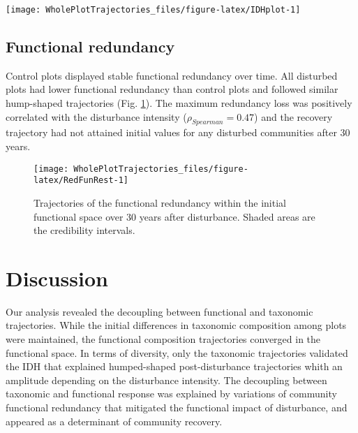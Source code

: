 \documentclass[fleqn,10pt]{ArtEcoFoG} %
\theoremstyle{definition}
\theoremstyle{definition}
\theoremstyle{definition}
\theoremstyle{remark}
\begin{document}
\begin{figure*}

{\centering \texttt{[image: WholePlotTrajectories\_files/figure-latex/IDHplot-1]} 

}

\caption{Relationship between the initial \%AGB loss and community taxonomic richness \textbf{(a)}, taxonomic evenness \textbf{(b)}, functional richness \textbf{(c)}, and functional evenness \textbf{(d)} at 10, 20, and 30 years after disturbance.}\label{fig:IDHplot}
\end{figure*}

\subsection{Functional redundancy}\label{functional-redundancy}

Control plots displayed stable functional redundancy over time. All
disturbed plots had lower functional redundancy than control plots and
followed similar hump-shaped trajectories (Fig. \ref{fig:RedFunRest}).
The maximum redundancy loss was positively correlated with the
disturbance intensity (\(\rho_{Spearman}=0.47\)) and the recovery
trajectory had not attained initial values for any disturbed communities
after 30 years.

\begin{figure}

{\centering \texttt{[image: WholePlotTrajectories\_files/figure-latex/RedFunRest-1]} 

}

\caption{Trajectories of the functional redundancy within the initial functional space over 30 years after disturbance. Shaded areas are the credibility intervals.}\label{fig:RedFunRest}
\end{figure}

\section{Discussion}\label{discussion}

Our analysis revealed the decoupling between functional and taxonomic
trajectories. While the initial differences in taxonomic composition
among plots were maintained, the functional composition trajectories
converged in the functional space. In terms of diversity, only the
taxonomic trajectories validated the IDH that explained humped-shaped
post-disturbance trajectories whith an amplitude depending on the
disturbance intensity. The decoupling between taxonomic and functional
response was explained by variations of community functional redundancy
that mitigated the functional impact of disturbance, and appeared as a
determinant of community recovery.
\end{document}
